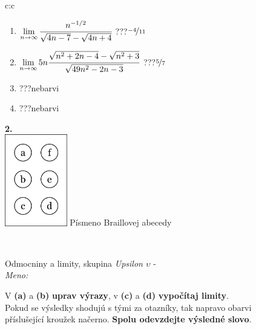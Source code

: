 \documentclass[10pt]{report}
\begin{document}
\begin{tabular}{c:c}
\begin{minipage}[c][104.5mm][t]{0.5\linewidth}
\begin{center}
\begin{minipage}{0.79\linewidth}
\begin{center}
\begin{varwidth}{\linewidth}
\begin{enumerate}
\item $\lim\limits_{n\to\infty}\cfrac{n^{-1/2}}{\sqrt{4n-7}-\sqrt{4n+4}}$\quad \dotfill\; ???\;\dotfill \quad $\nicefrac{-4}{11}$
\item $\lim\limits_{n\to\infty}5n\cfrac{\sqrt{n^2+2n-4}-\sqrt{n^2+3}}{\sqrt{49n^2-2n-3}}$\quad \dotfill\; ???\;\dotfill \quad $\nicefrac{5}{7}$
\item \quad \dotfill\; ???\;\dotfill \quad nebarvi
\item \quad \dotfill\; ???\;\dotfill \quad nebarvi
\end{enumerate}
\end{varwidth}
\end{center}
\end{minipage}
\begin{minipage}{0.20\linewidth}
\begin{center}
{\Huge\bfseries 2.} \\[2mm]
\includegraphics[height=40mm]{../images/braille.png}
{\small Písmeno Braillovej abecedy}
\end{center}
\end{minipage}
\end{center}
\end{minipage}
\\ \hdashline
\begin{minipage}[c][104.5mm][t]{0.5\linewidth}
\begin{center}
\vspace{7mm}
{\huge Odmocniny a limity, skupina \textit{Upsilon $\upsilon$} -}\\[5mm]
\textit{Meno:}\phantom{xxxxxxxxxxxxxxxxxxxxxxxxxxxxxxxxxxxxxxxxxxxxxxxxxxxxxxxxxxxxxxxxx}\\[5mm]
\begin{minipage}{0.95\linewidth}
\begin{center}
V \textbf{(a)} a \textbf{(b)} \textbf{uprav výrazy}, v \textbf{(c)} a \textbf{(d)} \textbf{vypočítaj limity}.\\Pokud se výsledky shodujú s tými za otazníky, tak napravo obarvi\\příslušející kroužek načerno. \textbf{Spolu odevzdejte výsledné slovo}.

\end{center}
\end{minipage}
\end{center}
\end{minipage}
\end{tabular}
\end{document}

